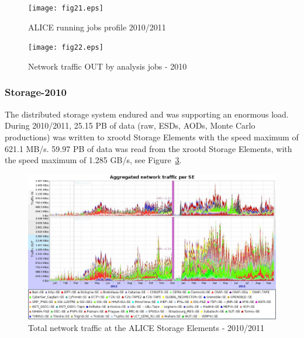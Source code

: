 \documentclass{intech}
\begin{document}
\begin{figure}[htb] %
\centering
\texttt{[image: fig21.eps]} %
\caption{ALICE running jobs profile 2010/2011}\label{fig21}
\end{figure}


\begin{figure}[htb] %
\centering
\texttt{[image: fig22.eps]} %
\caption{Network traffic OUT by analysis jobs - 2010}\label{fig22}
\end{figure}



\subsubsection{Storage-2010}
%
The distributed storage system endured and was supporting an
enormous load. During 2010/2011, 25.15 PB of data (raw, ESDs, AODs,
Monte Carlo  productions) was written to xrootd Storage Elements
with the speed maximum of 621.1 MB/s. 59.97 PB  of data was read
from the xrootd Storage Elements, with the speed maximum of 1.285
GB/s, see Figure~\ref{fig23}.

\begin{figure}[htb] %
\centering
\includegraphics[width=13cm]{fig23.eps} %
\caption{Total network traffic at the ALICE Storage Elements -
2010/2011}\label{fig23}
\end{figure}
\end{document}
